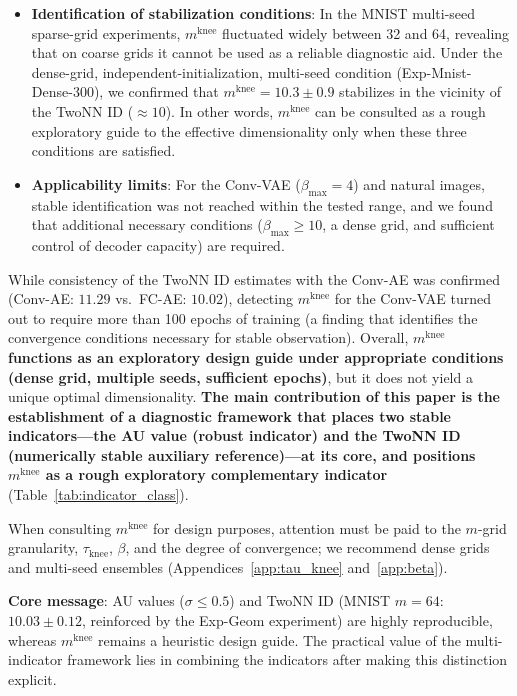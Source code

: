 \documentclass[make,article,submit,pdftex,moreauthors]{Definitions/mdpi}
\newcommand{\mknee}{m^{\mathrm{knee}}}
\begin{document}
\begin{itemize}
  \item \textbf{Identification of stabilization conditions}: In the MNIST multi-seed
        sparse-grid experiments, $\mknee$ fluctuated widely between 32 and 64,
        revealing that on coarse grids it cannot be used as a reliable diagnostic aid.
        Under the dense-grid, independent-initialization, multi-seed condition
        (Exp-Mnist-Dense-300), we confirmed that $\mknee = 10.3 \pm 0.9$ stabilizes
        in the vicinity of the TwoNN ID ($\approx 10$).
        In other words, $\mknee$ can be consulted as a rough exploratory guide to the
        effective dimensionality only when these three conditions are satisfied.
  \item \textbf{Applicability limits}: For the Conv-VAE ($\beta_{\max}=4$) and natural
        images, stable identification was not reached within the tested range, and we
        found that additional necessary conditions ($\beta_{\max} \geq 10$, a dense grid,
        and sufficient control of decoder capacity) are required.
\end{itemize}

While consistency of the TwoNN ID estimates with the Conv-AE was confirmed
(Conv-AE: $11.29$ vs.\ FC-AE: $10.02$), detecting $\mknee$ for the Conv-VAE turned
out to require more than 100 epochs of training (a finding that identifies the
convergence conditions necessary for stable observation).
Overall, \textbf{$\mknee$ functions as an exploratory design guide under appropriate
conditions (dense grid, multiple seeds, sufficient epochs)}, but it does not yield a
unique optimal dimensionality.
\textbf{The main contribution of this paper is the establishment of a diagnostic
framework that places two stable indicators---the AU value (robust indicator) and the
TwoNN ID (numerically stable auxiliary reference)---at its core, and positions $\mknee$
as a rough exploratory complementary indicator} (Table~\ref{tab:indicator_class}).

When consulting $\mknee$ for design purposes, attention must be paid to the $m$-grid
granularity, $\tau_\mathrm{knee}$, $\beta$, and the degree of convergence; we recommend
dense grids and multi-seed ensembles (Appendices~\ref{app:tau_knee} and~\ref{app:beta}).

\textbf{Core message}:
AU values ($\sigma \leq 0.5$) and TwoNN ID (MNIST $m=64$: $10.03 \pm 0.12$, reinforced
by the Exp-Geom experiment) are highly reproducible, whereas $\mknee$ remains a heuristic
design guide.
The practical value of the multi-indicator framework lies in combining the indicators
after making this distinction explicit.
\end{document}
